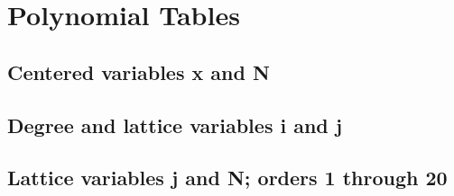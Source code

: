 \chapter{Polynomial Tables}
\section{Centered variables x and N}

\section{Degree and lattice variables i and j}

\section{Lattice variables j and N; orders 1 through 20}

